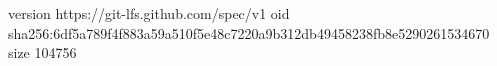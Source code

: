 version https://git-lfs.github.com/spec/v1
oid sha256:6df5a789f4f883a59a510f5e48c7220a9b312db49458238fb8e5290261534670
size 104756
